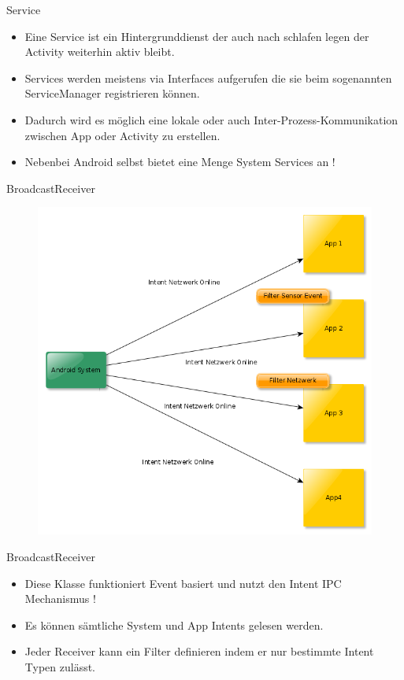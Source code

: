 \documentclass{beamer}
\begin{document}
\begin{frame}{Service}
\begin{itemize}
\item Eine Service ist ein Hintergrunddienst der auch nach schlafen legen der Activity weiterhin aktiv bleibt.
\item Services werden meistens via Interfaces aufgerufen die sie beim sogenannten ServiceManager registrieren können.
\item Dadurch wird es möglich eine lokale oder auch Inter-Prozess-Kommunikation zwischen App oder Activity zu erstellen.
\item Nebenbei Android selbst bietet eine Menge System Services an ! 
\end{itemize}
\end{frame}

\begin{frame}{BroadcastReceiver}
\begin{figure}[hb]
 \centering
 \includegraphics[scale=0.3]{android-br}
\end{figure}
\end{frame}

\begin{frame}{BroadcastReceiver}
\begin{itemize}
\item Diese Klasse funktioniert Event basiert und nutzt den Intent IPC Mechanismus !
\item Es können sämtliche System und App Intents gelesen werden.
\item Jeder Receiver kann ein Filter definieren indem er nur bestimmte Intent Typen zulässt.
\end{itemize}
\end{frame}
\end{document}
